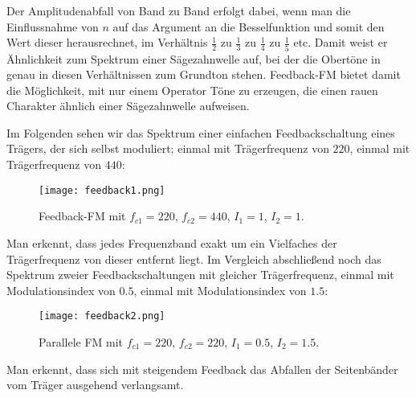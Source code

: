Der Amplitudenabfall von Band zu Band erfolgt dabei, wenn man die Einflussnahme von $n$ auf das Argument an die Besselfunktion und somit den Wert dieser herausrechnet, im Verhältnis $\frac{1}{2}$ zu $\frac{1}{3}$ zu $\frac{1}{4}$ zu $\frac{1}{5}$ etc. Damit weist er Ähnlichkeit zum Spektrum einer Sägezahnwelle auf, bei der die Obertöne in genau in diesen Verhältnissen zum Grundton stehen. Feedback-FM bietet damit die Möglichkeit, mit nur einem Operator Töne zu erzeugen, die einen rauen Charakter ähnlich einer Sägezahnwelle aufweisen. 

Im Folgenden sehen wir das Spektrum einer einfachen Feedbackschaltung eines Trägers, der sich selbst moduliert; einmal mit Trägerfrequenz von $220$, einmal mit Trägerfrequenz von $440$:
\FloatBarrier
\begin{figure} [ht]
\centering
  \texttt{[image: feedback1.png]}
\caption{Feedback-FM mit $f_{c1} = 220$, $f_{c2} = 440$, $I_1 = 1$, $I_2 = 1$. }
\end{figure}
\FloatBarrier
Man erkennt, dass jedes Frequenzband exakt um ein Vielfaches der Trägerfrequenz von dieser entfernt liegt. Im Vergleich abschließend noch das Spektrum zweier Feedbackschaltungen mit gleicher Trägerfrequenz, einmal mit Modulationsindex von $0.5$, einmal mit Modulationsindex von $1.5$:
\FloatBarrier
\begin{figure} [ht]
\centering
  \texttt{[image: feedback2.png]}
\caption{Parallele FM mit $f_{c1} = 220$, $f_{c2} = 220$, $I_1 = 0.5$, $I_2 = 1.5$. }
\end{figure}
\FloatBarrier
Man erkennt, dass sich mit steigendem Feedback das Abfallen der Seitenbänder vom Träger ausgehend verlangsamt.